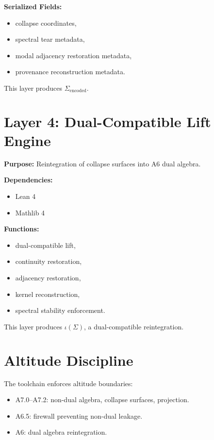 \documentclass[11pt]{article}
\begin{document}
\textbf{Serialized Fields:}
\begin{itemize}
  \item collapse coordinates,
  \item spectral tear metadata,
  \item modal adjacency restoration metadata,
  \item provenance reconstruction metadata.
\end{itemize}

This layer produces $\Sigma_{\mathrm{encoded}}$.

\section{Layer 4: Dual-Compatible Lift Engine}

\textbf{Purpose:} Reintegration of collapse surfaces into A6 dual algebra.

\textbf{Dependencies:}
\begin{itemize}
  \item Lean 4
  \item Mathlib 4
\end{itemize}

\textbf{Functions:}
\begin{itemize}
  \item dual-compatible lift,
  \item continuity restoration,
  \item adjacency restoration,
  \item kernel reconstruction,
  \item spectral stability enforcement.
\end{itemize}

This layer produces $\iota(\Sigma)$, a dual-compatible reintegration.

\section{Altitude Discipline}

The toolchain enforces altitude boundaries:

\begin{itemize}
  \item A7.0–A7.2: non-dual algebra, collapse surfaces, projection.
  \item A6.5: firewall preventing non-dual leakage.
  \item A6: dual algebra reintegration.
\end{itemize}
\end{document}
